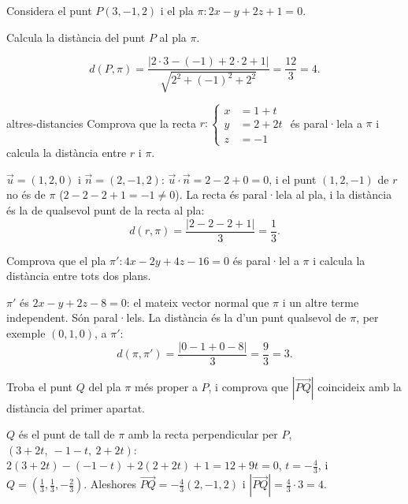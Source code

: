 Considera el punt $P(3,-1,2)$ i el pla $\pi\colon 2x-y+2z+1=0$.

\begin{apartats}

Calcula la distància del punt $P$ al pla $\pi$.

\begin{solucio}
\[
d(P,\pi)=\frac{|2\cdot3-(-1)+2\cdot2+1|}{\sqrt{2^2+(-1)^2+2^2}}=\frac{12}{3}=4.
\]
\end{solucio}

\begin{tria}{altres-distancies}
Comprova que la recta $r\colon\left\{\begin{aligned}x&=1+t\\y&=2+2t\\z&=-1\end{aligned}\right.$ és
paral·lela a $\pi$ i calcula la distància entre $r$ i $\pi$.

\begin{solucio}
$\vec u=(1,2,0)$ i $\vec n=(2,-1,2)$: $\vec u\cdot\vec n=2-2+0=0$, i el punt $(1,2,-1)$ de $r$ no és
de $\pi$ ($2-2-2+1=-1\ne0$). La recta és paral·lela al pla, i la distància és la de qualsevol punt de
la recta al pla:
\[
d(r,\pi)=\frac{|2-2-2+1|}{3}=\frac13.
\]
\end{solucio}

Comprova que el pla $\pi'\colon 4x-2y+4z-16=0$ és paral·lel a $\pi$ i calcula la distància entre tots
dos plans.

\begin{solucio}
$\pi'$ és $2x-y+2z-8=0$: el mateix vector normal que $\pi$ i un altre terme independent. Són
paral·lels. La distància és la d'un punt qualsevol de $\pi$, per exemple $(0,1,0)$, a $\pi'$:
\[
d(\pi,\pi')=\frac{|0-1+0-8|}{3}=\frac93=3.
\]
\end{solucio}
\end{tria}

\begin{nomesllarg}
Troba el punt $Q$ del pla $\pi$ més proper a $P$, i comprova que $|\overrightarrow{PQ}|$ coincideix amb la
distància del primer apartat.

\begin{solucio}
$Q$ és el punt de tall de $\pi$ amb la recta perpendicular per $P$, $(3+2t,\ -1-t,\ 2+2t)$:
$2(3+2t)-(-1-t)+2(2+2t)+1=12+9t=0$, $t=-\frac43$, i
$Q=\left(\frac13,\frac13,-\frac23\right)$. Aleshores
$\overrightarrow{PQ}=-\frac43(2,-1,2)$ i $|\overrightarrow{PQ}|=\frac43\cdot3=4$.
\end{solucio}
\end{nomesllarg}

\end{apartats}
